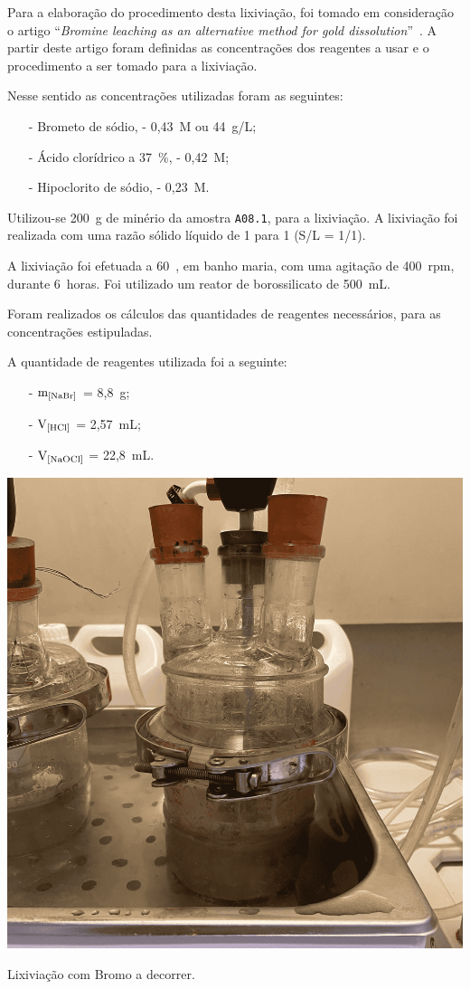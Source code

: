 Para a elaboração do procedimento desta lixiviação, foi tomado em consideração o artigo ``\emph{Bromine leaching as an alternative method for gold dissolution}''~\cite{bromo_2018}.
A partir deste artigo foram definidas as concentrações dos reagentes a usar e o procedimento a ser tomado para a lixiviação.

Nesse sentido as concentrações utilizadas foram as seguintes:
\begin{itemize}
    \item[-] Brometo de sódio, \bromo{} - 0,43~M ou 44~g/L;
    \item[-] Ácido clorídrico a 37~\%, \acl{} - 0,42~M;
    \item[-] Hipoclorito de sódio, \hipso{} - 0,23~M.  
\end{itemize}

Utilizou-se 200~g de minério da amostra \texttt{A08.1}, para a lixiviação.
A lixiviação foi realizada com uma razão sólido líquido de 1 para 1 (S/L = 1/1).

A lixiviação foi efetuada a 60~\graus{}, em banho maria, com uma agitação de 400~rpm, durante 6~horas.
Foi utilizado um reator de borossilicato de 500~mL.

Foram realizados os cálculos das quantidades de reagentes necessários, para as concentrações estipuladas. 

A quantidade de reagentes utilizada foi a seguinte:
\begin{itemize}
    \item[-] $\mathrm{m}_{\left[\bromo{}\right]}$ = 8,8~g;
    \item[-] $\mathrm{V}_{\left[\acl{}\right]}$ = 2,57~mL;
    \item[-] $\mathrm{V}_{\left[\hipso{}\right]}$ = 22,8~mL.
\end{itemize}

\begin{marginfigure}
    \centering
    \includegraphics[width=0.9\linewidth]{figures/lixiviação bromo}
    \caption{Lixiviação com Bromo a decorrer.}
    \label{fig:lixiacao-bromo}
\end{marginfigure}

